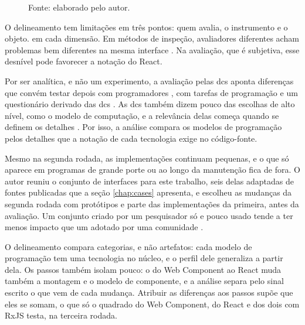 \begin{figure}[htbp]
\small Fonte: elaborado pelo autor.
\end{figure}

O delineamento tem limitações em três pontos: quem avalia, o instrumento e o
objeto.
em cada dimensão.
Em métodos de inspeção, avaliadores diferentes acham problemas bem
diferentes na mesma interface \cite[p. 183]{hertzum2003}.
Na avaliação, que é subjetiva, esse desnível pode favorecer a notação do
React.

Por ser analítica, e não um experimento, a avaliação pelas \glspl{dc} aponta
diferenças que convém testar depois com programadores
\cite[p. 103]{kiss2014}, com tarefas de programação e um questionário
derivado das \glspl{dc} \cite[p. 76-77 e 82]{lima2024}.
As \glspl{dc} também dizem pouco das escolhas de alto nível, como o
modelo de computação, e a relevância delas começa quando se definem os
detalhes \cite[p. 139]{green1996d}.
Por isso, a análise compara os modelos de programação pelos detalhes que
a notação de cada tecnologia exige no código-fonte.

Mesmo na segunda rodada, as implementações continuam pequenas, e o que só aparece em
programas de grande porte ou ao longo da manutenção fica de fora.
O autor reuniu o conjunto de interfaces para este trabalho, seis delas
adaptadas de fontes publicadas que a seção \ref{chap:cases} apresenta, e
escolheu as mudanças da segunda rodada com protótipos e parte das
implementações da primeira, antes da avaliação.
Um conjunto criado por um pesquisador só e pouco usado tende a ter menos
impacto que um adotado por uma comunidade \cite[p. 76]{sim2003}.

O delineamento compara categorias, e não artefatos: cada modelo de
programação tem uma tecnologia no núcleo, e o perfil dele generaliza a
partir dela.
Os passos também isolam pouco: o do Web Component ao React muda também
a montagem e o modelo de componente, e a análise separa pelo sinal
escrito o que vem de cada mudança.
Atribuir as diferenças aos passos supõe que eles se somam, o que só o quadrado do Web Component, do React
e dos dois com RxJS testa, na terceira rodada.

